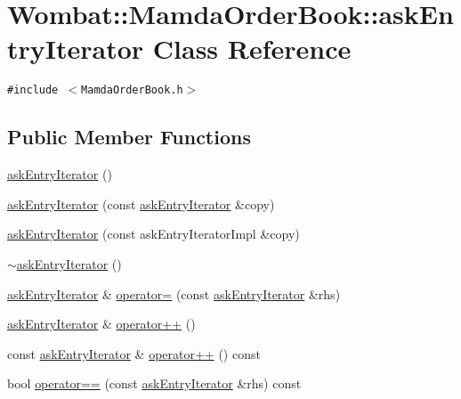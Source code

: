 \hypertarget{classWombat_1_1MamdaOrderBook_1_1askEntryIterator}{
\section{Wombat::Mamda\-Order\-Book::ask\-Entry\-Iterator Class Reference}
\label{classWombat_1_1MamdaOrderBook_1_1askEntryIterator}
}
{\tt \#include $<$Mamda\-Order\-Book.h$>$}

\subsection*{Public Member Functions}
\begin{CompactItemize}
\item 
\hyperlink{classWombat_1_1MamdaOrderBook_1_1askEntryIterator_9cce173ec31e42c1e2f236c2f7baeefc}{ask\-Entry\-Iterator} ()
\item 
\hyperlink{classWombat_1_1MamdaOrderBook_1_1askEntryIterator_a6922535ed7167defd431cbe5db3b7d9}{ask\-Entry\-Iterator} (const \hyperlink{classWombat_1_1MamdaOrderBook_1_1askEntryIterator}{ask\-Entry\-Iterator} \&copy)
\item 
\hyperlink{classWombat_1_1MamdaOrderBook_1_1askEntryIterator_c3208409dea2fae5a4977f2d69209d7d}{ask\-Entry\-Iterator} (const ask\-Entry\-Iterator\-Impl \&copy)
\item 
\hyperlink{classWombat_1_1MamdaOrderBook_1_1askEntryIterator_d7db1bdfba6c496ea962de62230bf7e2}{$\sim$ask\-Entry\-Iterator} ()
\item 
\hyperlink{classWombat_1_1MamdaOrderBook_1_1askEntryIterator}{ask\-Entry\-Iterator} \& \hyperlink{classWombat_1_1MamdaOrderBook_1_1askEntryIterator_d3c6aef498ea3a63debd4304344931b2}{operator=} (const \hyperlink{classWombat_1_1MamdaOrderBook_1_1askEntryIterator}{ask\-Entry\-Iterator} \&rhs)
\item 
\hyperlink{classWombat_1_1MamdaOrderBook_1_1askEntryIterator}{ask\-Entry\-Iterator} \& \hyperlink{classWombat_1_1MamdaOrderBook_1_1askEntryIterator_dd6fe29f2e97eaaf180f47a4f218b359}{operator++} ()
\item 
const \hyperlink{classWombat_1_1MamdaOrderBook_1_1askEntryIterator}{ask\-Entry\-Iterator} \& \hyperlink{classWombat_1_1MamdaOrderBook_1_1askEntryIterator_3bb3d665738698ff8dc1407e030654cb}{operator++} () const 
\item 
bool \hyperlink{classWombat_1_1MamdaOrderBook_1_1askEntryIterator_37588e5ba65e55f8c8f72c07e8ebec7b}{operator==} (const \hyperlink{classWombat_1_1MamdaOrderBook_1_1askEntryIterator}{ask\-Entry\-Iterator} \&rhs) const 

\end{CompactItemize}
